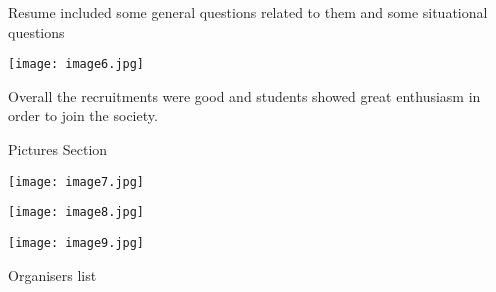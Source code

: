 \documentclass[12pt, a4 paper]{article}
\begin{document}
\begin{center}
\begin{Large}
\begin{multicols}{2}
\end{multicols} 

\begin{multicols}{2}
 Resume included some general questions related to them and some situational questions

\columnbreak
\texttt{[image: image6.jpg]}
  
\end{multicols} 


Overall the recruitments were good and students showed great enthusiasm in order to join the society.
  

\end{Large} 
\end{center}

\newpage 


\begin{center}
\Huge Pictures Section

\medskip\medskip\medskip

\texttt{[image: image7.jpg]}

\medskip\medskip\medskip

\texttt{[image: image8.jpg]}

\medskip\medskip\medskip

\texttt{[image: image9.jpg]}
\end{center}
\newpage
\begin{center}
\huge Organisers list
\end{center}
\end{document}

